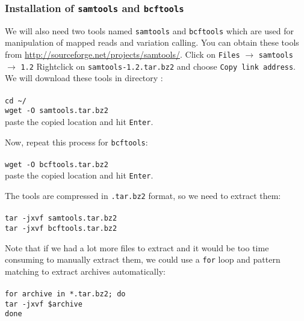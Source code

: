 \subsubsection{Installation of \texttt{samtools} and \texttt{bcftools}}
We will also need two tools named \texttt{samtools} and \texttt{bcftools} which are used for
manipulation of mapped reads and variation calling. You can obtain these tools from
\url{http://sourceforge.net/projects/samtools/}. Click on \texttt{Files} $\rightarrow$ \texttt{samtools} $\rightarrow$ \texttt{1.2}
Rightclick on \texttt{samtools-1.2.tar.bz2} and choose \texttt{Copy link address}. 
We will download these tools in directory \texttt{\progDir}:\\~\\
\texttt{cd \textasciitilde/\progDir}\\
\texttt{wget -O samtools.tar.bz2}\\
paste the copied location and hit \texttt{Enter}.

Now, repeat this process for \texttt{bcftools}:\\~\\
\texttt{wget -O bcftools.tar.bz2}\\
paste the copied location and hit \texttt{Enter}.

The tools are compressed in \texttt{.tar.bz2}
format, so we need to extract them:\\~\\
\texttt{tar -jxvf samtools.tar.bz2}\\
\texttt{tar -jxvf bcftools.tar.bz2}\\

\begin{framed}
Note that if we had a lot more files to extract and it would be too
time consuming to manually extract them, we could use a \texttt{for}
loop and pattern matching to extract archives automatically:\\~\\
\texttt{for archive in *.tar.bz2; do}\\
\texttt{\indent tar -jxvf \$archive}\\
\texttt{done}\\
\end{framed}

